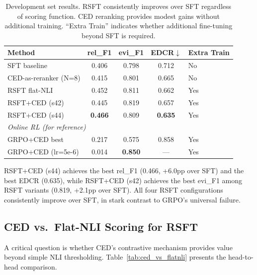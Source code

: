 \documentclass[11pt,a4paper]{article}
\begin{document}
\begin{table}[t]
\centering
\caption{Development set results. RSFT consistently improves over SFT regardless of scoring function. CED reranking provides modest gains without additional training. ``Extra Train'' indicates whether additional fine-tuning beyond SFT is required.}
\label{tab:main_dev}
\small
\begin{tabular}{lcccl}
\toprule
\textbf{Method} & \textbf{rel\_F1} & \textbf{evi\_F1} & \textbf{EDCR}$\downarrow$ & \textbf{Extra Train} \\
\midrule
SFT baseline          & 0.406 & 0.798 & 0.712 & No \\
CED-as-reranker (N=8) & 0.415 & 0.801 & 0.665 & No \\
RSFT flat-NLI         & 0.452 & 0.811 & 0.662 & Yes \\
RSFT+CED (s42)        & 0.445 & 0.819 & 0.657 & Yes \\
RSFT+CED (s44)        & \textbf{0.466} & 0.809 & \textbf{0.635} & Yes \\
\midrule
\multicolumn{5}{l}{\textit{Online RL (for reference)}} \\
GRPO+CED best         & 0.217 & 0.575 & 0.858 & Yes \\
GRPO+CED (lr=5e-6)    & 0.014 & \textbf{0.850} & --- & Yes \\
\bottomrule
\end{tabular}
\end{table}

RSFT+CED (s44) achieves the best rel\_F1 (0.466, +6.0pp over SFT) and the best EDCR (0.635), while RSFT+CED (s42) achieves the best evi\_F1 among RSFT variants (0.819, +2.1pp over SFT).
All four RSFT configurations consistently improve over SFT, in stark contrast to GRPO's universal failure.

\subsection{CED vs.\ Flat-NLI Scoring for RSFT}
\label{sec:ced_vs_flatnli}

A critical question is whether CED's contrastive mechanism provides value beyond simple NLI thresholding.
Table~\ref{tab:ced_vs_flatnli} presents the head-to-head comparison.
\end{document}
